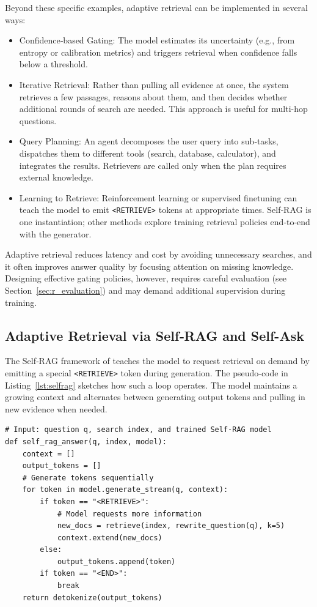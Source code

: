 Beyond these specific examples, adaptive retrieval can be implemented in several ways:
\begin{itemize}
\item Confidence‑based Gating:  The model estimates its uncertainty (e.g., from entropy or calibration metrics) and triggers retrieval when confidence falls below a threshold.
\item Iterative Retrieval:  Rather than pulling all evidence at once, the system retrieves a few passages, reasons about them, and then decides whether additional rounds of search are needed.  This approach is useful for multi-hop questions.
\item Query Planning:  An agent decomposes the user query into sub‑tasks, dispatches them to different tools (search, database, calculator), and integrates the results.  Retrievers are called only when the plan requires external knowledge.
\item Learning to Retrieve:  Reinforcement learning or supervised finetuning can teach the model to emit \texttt{<RETRIEVE>} tokens at appropriate times.  Self‑RAG is one instantiation; other methods explore training retrieval policies end‑to‑end with the generator.
\end{itemize}
%
Adaptive retrieval reduces latency and cost by avoiding unnecessary searches, and it often improves answer quality by focusing attention on missing knowledge.  Designing effective gating policies, however, requires careful evaluation (see Section~\ref{sec:r_evaluation}) and may demand additional supervision during training.


\subsection{Adaptive Retrieval via Self‑RAG and Self-Ask}

The Self‑RAG framework of \citet{asai2023selfrag} teaches the model to request retrieval on demand by emitting a special \texttt{<RETRIEVE>} token during generation.  The pseudo-code in Listing~\ref{lst:selfrag} sketches how such a loop operates.  The model maintains a growing context and alternates between generating output tokens and pulling in new evidence when needed.

\begin{listing}[!ht]
\begin{verbatim}
# Input: question q, search index, and trained Self-RAG model
def self_rag_answer(q, index, model):
    context = []
    output_tokens = []
    # Generate tokens sequentially
    for token in model.generate_stream(q, context):
        if token == "<RETRIEVE>":
            # Model requests more information
            new_docs = retrieve(index, rewrite_question(q), k=5)
            context.extend(new_docs)
        else:
            output_tokens.append(token)
        if token == "<END>":
            break
    return detokenize(output_tokens)
\end{verbatim}
\caption{High Level Pseudo-Code Demonstrating Self-RAG}
\label{lst:selfrag}
\end{listing}

